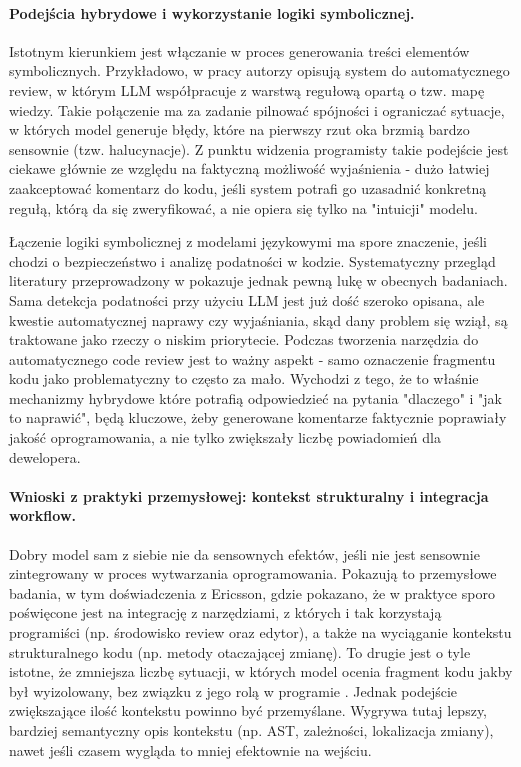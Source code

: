 \paragraph{Podejścia hybrydowe i wykorzystanie logiki symbolicznej.} 
Istotnym kierunkiem jest włączanie w proces generowania treści elementów symbolicznych. Przykładowo, w pracy
\cite{Icoz2025SymbolicReasoning} autorzy opisują system do automatycznego review, w którym LLM współpracuje z warstwą regułową opartą o tzw. mapę wiedzy.
Takie połączenie ma za zadanie pilnować spójności i ograniczać sytuacje, w których model generuje błędy, które na pierwszy 
rzut oka brzmią bardzo sensownie (tzw. halucynacje). Z punktu widzenia programisty takie podejście jest 
ciekawe głównie ze względu na faktyczną możliwość wyjaśnienia - dużo łatwiej zaakceptować komentarz do kodu, jeśli 
system potrafi go uzasadnić konkretną regułą, którą da się zweryfikować, a nie opiera się 
tylko na "intuicji" modelu.

Łączenie logiki symbolicznej z modelami językowymi ma spore znaczenie, jeśli chodzi o bezpieczeństwo i analizę podatności w kodzie.
Systematyczny przegląd literatury przeprowadzony w \cite{Germano2025VulnSLR} pokazuje jednak 
pewną lukę w obecnych badaniach. Sama detekcja podatności przy użyciu LLM jest już dość szeroko opisana, ale kwestie automatycznej
naprawy czy wyjaśniania, skąd dany problem się wziął, są traktowane jako rzeczy o niskim priorytecie. Podczas tworzenia
narzędzia do automatycznego code review jest to ważny aspekt - samo oznaczenie fragmentu kodu jako problematyczny to często za mało.
Wychodzi z tego, że to właśnie mechanizmy hybrydowe które potrafią odpowiedzieć na pytania "dlaczego" i "jak to naprawić", będą 
kluczowe, żeby generowane komentarze faktycznie poprawiały jakość oprogramowania, a nie tylko zwiększały liczbę powiadomień 
dla dewelopera.

\paragraph{Wnioski z praktyki przemysłowej: kontekst strukturalny i integracja workflow.}
Dobry model sam z siebie nie da sensownych efektów, jeśli nie jest sensownie zintegrowany w proces wytwarzania oprogramowania.
Pokazują to przemysłowe badania, w tym doświadczenia z Ericsson, gdzie pokazano, że w praktyce sporo poświęcone jest na integrację z narzędziami, z których i 
tak korzystają programiści (np. środowisko review oraz edytor), a także na wyciąganie kontekstu strukturalnego 
kodu (np. metody otaczającej zmianę). To drugie jest o tyle istotne, że zmniejsza liczbę sytuacji, w których model ocenia fragment kodu jakby był wyizolowany,
bez związku z jego rolą w programie \cite{Ramesh2025EricssonExperience}. Jednak podejście zwiększające ilość kontekstu
powinno być przemyślane. Wygrywa tutaj lepszy, bardziej semantyczny opis kontekstu 
(np. AST, zależności, lokalizacja zmiany), nawet jeśli czasem wygląda to mniej efektownie na wejściu.

